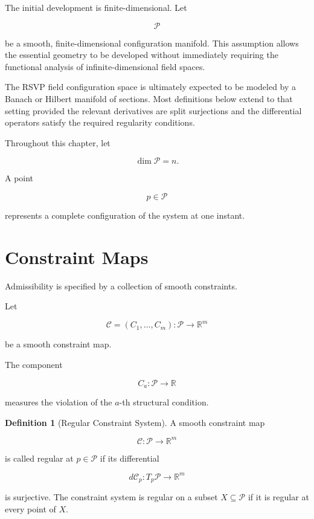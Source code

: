 \documentclass[11pt,oneside]{book}
\numberwithin{equation}{chapter}
\theoremstyle{definition}
\newtheorem{definition}{Definition}[chapter]
\theoremstyle{plain}
\begin{document}
The initial development is finite-dimensional. Let

\[
\mathcal P
\]

be a smooth, finite-dimensional configuration manifold. This assumption
allows the essential geometry to be developed without immediately requiring
the functional analysis of infinite-dimensional field spaces.

The RSVP field configuration space is ultimately expected to be modeled by a
Banach or Hilbert manifold of sections. Most definitions below extend to
that setting provided the relevant derivatives are split surjections and the
differential operators satisfy the required regularity conditions.

Throughout this chapter, let

\[
\dim \mathcal P=n.
\]

A point

\[
p\in\mathcal P
\]

represents a complete configuration of the system at one instant.

\section{Constraint Maps}

Admissibility is specified by a collection of smooth constraints.

Let

\[
\mathcal C
=
(C_1,\ldots,C_m):
\mathcal P
\longrightarrow
\mathbb R^m
\]

be a smooth constraint map.

The component

\[
C_a:\mathcal P\longrightarrow\mathbb R
\]

measures the violation of the \(a\)-th structural condition.

\begin{definition}[Regular Constraint System]

A smooth constraint map

\[
\mathcal C:\mathcal P\longrightarrow\mathbb R^m
\]

is called regular at \(p\in\mathcal P\) if its differential

\[
d\mathcal C_p:
T_p\mathcal P
\longrightarrow
\mathbb R^m
\]

is surjective. The constraint system is regular on a subset \(X\subseteq\mathcal P\) if it is regular at every point of \(X\).

\end{definition}
\end{document}
